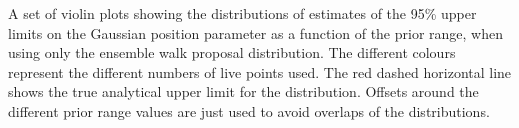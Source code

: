\label{fig:walkpropuls}
A set of violin plots showing the distributions of estimates of the 95\% upper limits on the Gaussian position parameter as a function of the prior range, when using only the ensemble walk proposal distribution. The different colours represent the different numbers of live points  used. The red dashed horizontal line shows the true analytical upper limit for the distribution.
Offsets around the different prior range values are just used to avoid overlaps of the
distributions.
